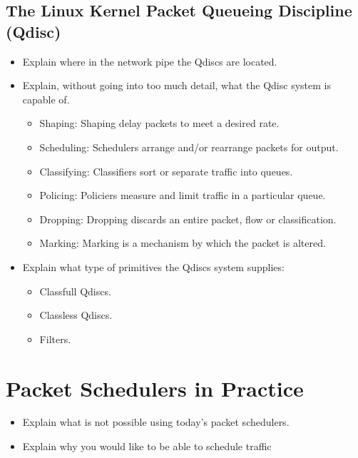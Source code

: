 \documentclass[sigconf, nonacm]{acmart}
\begin{document}
\subsection{The Linux Kernel Packet Queueing Discipline (Qdisc)}

\begin{itemize}
  \item Explain where in the network pipe the Qdiscs are located.
  \item Explain, without going into too much detail, what the Qdisc system is capable of.
        \begin{itemize}
          \item Shaping: Shaping delay packets to meet a desired rate.
          \item Scheduling: Schedulers arrange and/or rearrange packets for output.
          \item Classifying: Classifiers sort or separate traffic into queues.
          \item Policing: Policiers measure and limit traffic in a particular queue.
          \item Dropping: Dropping discards an entire packet, flow or classification.
          \item Marking: Marking is a mechanism by which the packet is altered.
        \end{itemize}
  \item Explain what type of primitives the Qdiscs system supplies:
        \begin{itemize}
          \item Classfull Qdiscs.
          \item Classless Qdiscs.
          \item Filters.
        \end{itemize}
\end{itemize}


\section{Packet Schedulers in Practice}


\begin{itemize}
  \item Explain what is not possible using today's packet schedulers.
  \item Explain why you would like to be able to schedule traffic
\end{itemize}
\end{document}
